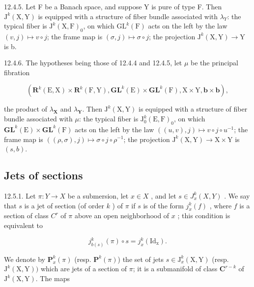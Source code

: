 12.4.5. Let F be a Banach space, and suppose Y is pure of type F. Then \(\mathrm{J}^{k}(\mathrm{X},\mathrm{Y})\) is equipped with a structure of fiber bundle associated with \(\lambda_{Y}\): the typical fiber is \(\mathrm{J}^{k}(\mathrm{X},\mathrm{F})_{0}\), on which \(\mathrm{GL}^{k}(\mathrm{F})\) acts on the left by the law \((v,j)\mapsto v\circ j\); the frame map is \((\sigma,j)\mapsto\sigma\circ j\); the projection \(\mathrm{J}^{k}(\mathrm{X},\mathrm{Y})\to\mathrm{Y}\) is b.

12.4.6. The hypotheses being those of 12.4.4 and 12.4.5, let \(\mu\) be the principal fibration

\[
(\mathbf {R} ^ {k} (\mathrm{E}, \mathrm{X}) \times \mathbf {R} ^ {k} (\mathrm{F}, \mathrm{Y}), \mathbf {G L} ^ {k} (\mathrm{E}) \times \mathbf {G L} ^ {k} (\mathrm{F}), \mathrm{X} \times \mathrm{Y}, \boldsymbol {b} \times \boldsymbol {b}),
\]

the product of \(\lambda_{\mathbf{X}}\) and \(\lambda_{\mathbf{Y}}\). Then \(\mathrm{J}^{k}(\mathrm{X},\mathrm{Y})\) is equipped with a structure of fiber bundle associated with \(\mu\): the typical fiber is \(\mathrm{J}_{0}^{k}(\mathrm{E},\mathrm{F})_{0}\), on which \(\mathbf{GL}^{k}(\mathrm{E})\times \mathbf{GL}^{k}(\mathrm{F})\) acts on the left by the law \(((u,v),j)\mapsto v\circ j\circ u^{-1}\); the frame map is \(((\rho ,\sigma),j)\mapsto \sigma \circ j\circ \rho^{-1}\); the projection \(\mathrm{J}^k (\mathrm{X},\mathrm{Y})\to \mathrm{X}\times \mathrm{Y}\) is \((s,b)\).

\subsection{Jets of sections}

12.5.1. Let \(\pi: Y \to X\) be a submersion, let \(x \in X\) , and let \(s \in J_x^k(X, Y)\) . We say that \(s\) is a jet of section (of order \(k\) ) of \(\pi\) if \(s\) is of the form \(j_x^k(f)\) , where \(f\) is a section of class \(C^r\) of \(\pi\) above an open neighborhood of \(x\) ; this condition is equivalent to

\[
j _ {b (s)} ^ {k} (\pi) \circ s = j _ {x} ^ {k} (\mathrm{Id} _ {\mathrm{x}}).
\]

We denote by \(\mathbf{P}_x^k (\pi)\) (resp. \(\mathbf{P}^k (\pi)\)) the set of jets \(s\in \mathrm{J}_x^k (\mathrm{X},\mathrm{Y})\) (resp. \(\mathrm{J}^k (\mathrm{X},\mathrm{Y}))\) which are jets of a section of \(\pi\); it is a submanifold of class \(\mathbf{C}^{r - k}\) of \(\mathrm{J}^k (\mathrm{X},\mathrm{Y})\). The maps

